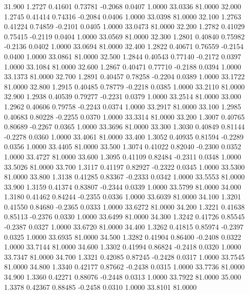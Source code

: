   31.900   1.2727   0.41601   0.73781  -0.2068   0.0407   1.0000  33.0336  81.0000
  32.000   1.2745   0.41414   0.74316  -0.2084   0.0406   1.0000  33.0398  81.0000
  32.100   1.2763   0.41224   0.74859  -0.2101   0.0405   1.0000  33.0473  81.0000
  32.200   1.2782   0.41029   0.75415  -0.2119   0.0404   1.0000  33.0569  81.0000
  32.300   1.2801   0.40840   0.75982  -0.2136   0.0402   1.0000  33.0694  81.0000
  32.400   1.2822   0.40671   0.76559  -0.2154   0.0400   1.0000  33.0861  81.0000
  32.500   1.2844   0.40543   0.77140  -0.2172   0.0397   1.0000  33.1084  81.0000
  32.600   1.2867   0.40471   0.77710  -0.2188   0.0394   1.0000  33.1373  81.0000
  32.700   1.2891   0.40457   0.78258  -0.2204   0.0389   1.0000  33.1722  81.0000
  32.800   1.2915   0.40485   0.78779  -0.2218   0.0385   1.0000  33.2110  81.0000
  32.900   1.2938   0.40539   0.79277  -0.2231   0.0379   1.0000  33.2514  81.0000
  33.000   1.2962   0.40606   0.79758  -0.2243   0.0374   1.0000  33.2917  81.0000
  33.100   1.2985   0.40683   0.80228  -0.2255   0.0370   1.0000  33.3314  81.0000
  33.200   1.3007   0.40765   0.80689  -0.2267   0.0365   1.0000  33.3696  81.0000
  33.300   1.3030   0.40849   0.81144  -0.2278   0.0360   1.0000  33.4061  81.0000
  33.400   1.3052   0.40935   0.81594  -0.2289   0.0356   1.0000  33.4405  81.0000
  33.500   1.3074   0.41022   0.82040  -0.2300   0.0352   1.0000  33.4727  81.0000
  33.600   1.3095   0.41109   0.82484  -0.2311   0.0348   1.0000  33.5026  81.0000
  33.700   1.3117   0.41197   0.82927  -0.2322   0.0345   1.0000  33.5300  81.0000
  33.800   1.3138   0.41285   0.83367  -0.2333   0.0342   1.0000  33.5553  81.0000
  33.900   1.3159   0.41374   0.83807  -0.2344   0.0339   1.0000  33.5799  81.0000
  34.000   1.3180   0.41462   0.84244  -0.2355   0.0336   1.0000  33.6039  81.0000
  34.100   1.3201   0.41550   0.84680  -0.2365   0.0333   1.0000  33.6272  81.0000
  34.200   1.3221   0.41638   0.85113  -0.2376   0.0330   1.0000  33.6499  81.0000
  34.300   1.3242   0.41726   0.85545  -0.2387   0.0327   1.0000  33.6720  81.0000
  34.400   1.3262   0.41815   0.85974  -0.2397   0.0325   1.0000  33.6935  81.0000
  34.500   1.3282   0.41904   0.86400  -0.2408   0.0322   1.0000  33.7144  81.0000
  34.600   1.3302   0.41994   0.86824  -0.2418   0.0320   1.0000  33.7347  81.0000
  34.700   1.3321   0.42085   0.87245  -0.2428   0.0317   1.0000  33.7545  81.0000
  34.800   1.3340   0.42177   0.87662  -0.2438   0.0315   1.0000  33.7736  81.0000
  34.900   1.3360   0.42271   0.88076  -0.2448   0.0313   1.0000  33.7922  81.0000
  35.000   1.3378   0.42367   0.88485  -0.2458   0.0310   1.0000  33.8101  81.0000
